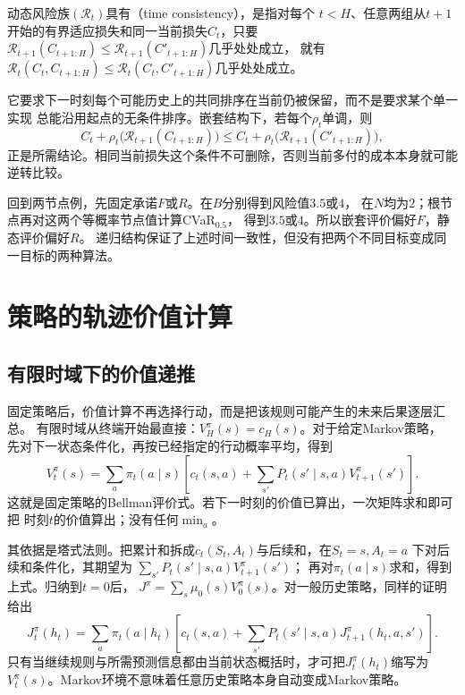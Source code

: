 \begin{definition}[递归意义下的时间一致性]
\label{def:decision-time-consistency}
动态风险族$(\mathcal R_t)$具有（time consistency），是指对每个
$t<H$、任意两组从$t+1$开始的有界适应损失和同一当前损失$C_t$，只要
$\mathcal R_{t+1}(C_{t+1:H})\leq\mathcal R_{t+1}(C'_{t+1:H})$几乎处处成立，
就有$\mathcal R_t(C_t,C_{t+1:H})\leq\mathcal R_t(C_t,C'_{t+1:H})$几乎处处成立。
\end{definition}
它要求下一时刻每个可能历史上的共同排序在当前仍被保留，而不是要求某个单一实现
总能沿用起点的无条件排序。嵌套结构下，若每个$\rho_t$单调，则
\[
  C_t+\rho_t\bigl(\mathcal R_{t+1}(C_{t+1:H})\bigr)
  \leq
  C_t+\rho_t\bigl(\mathcal R_{t+1}(C'_{t+1:H})\bigr),
\]
正是所需结论。相同当前损失这个条件不可删除，否则当前多付的成本本身就可能逆转比较。

回到两节点例，先固定承诺$F$或$R$。在$B$分别得到风险值$3.5$或$4$，
在$N$均为$2$；根节点再对这两个等概率节点值计算CVaR$_{0.5}$，
得到$3.5$或$4$。所以嵌套评价偏好$F$，静态评价偏好$R$。
递归结构保证了上述时间一致性，但没有把两个不同目标变成同一目标的两种算法。

\section{策略的轨迹价值计算}
\label{sec:policy-value-evaluation}

\subsection{有限时域下的价值递推}
\label{sec:policy-finite-evaluation}

固定策略后，价值计算不再选择行动，而是把该规则可能产生的未来后果逐层汇总。
有限时域从终端开始最直接：$V_H^\pi(s)=c_H(s)$。对于给定Markov策略，
先对下一状态条件化，再按已经指定的行动概率平均，得到
\begin{equation}
  V_t^\pi(s)=\sum_a\pi_t(a\mid s)
  \left[c_t(s,a)+\sum_{s'}P_t(s'\mid s,a)V_{t+1}^\pi(s')\right].
  \label{eq:decision-policy-bellman}
\end{equation}
这就是固定策略的Bellman评价式。若下一时刻的价值已算出，一次矩阵求和即可把
时刻$t$的价值算出；没有任何$\min_a$。

其依据是塔式法则。把累计和拆成$c_t(S_t,A_t)$与后续和，在$S_t=s,A_t=a$
下对后续和条件化，其期望为
$\sum_{s'}P_t(s'\mid s,a)V_{t+1}^\pi(s')$；
再对$\pi_t(a\mid s)$求和，得到上式。归纳到$t=0$后，
$J^\pi=\sum_s\mu_0(s)V_0^\pi(s)$。对一般历史策略，同样的证明给出
\[
  J_t^\pi(h_t)=\sum_a\pi_t(a\mid h_t)
  \left[c_t(s,a)+\sum_{s'}P_t(s'\mid s,a)
    J_{t+1}^\pi(h_t,a,s')\right].
\]
只有当继续规则与所需预测信息都由当前状态概括时，才可把$J_t^\pi(h_t)$缩写为
$V_t^\pi(s)$。Markov环境不意味着任意历史策略本身自动变成Markov策略。

